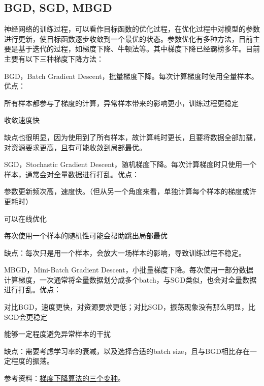 \subsection{BGD, SGD, MBGD}
神经网络的训练过程，可以看作目标函数的优化过程，在优化过程中对模型的参数进行更新，使目标函数逐步收敛到一个最优的状态。参数优化有多种方法，目前主要是基于迭代的过程，如梯度下降、牛顿法等。其中梯度下降已经霸榜多年。目前主要有以下三种梯度下降方法：
\begin{myitemize}
	\item BGD，Batch  Gradient Descent，批量梯度下降。每次计算梯度时使用全量样本。优点：
	\begin{myitemize}
		\item 所有样本都参与了梯度的计算，异常样本带来的影响更小，训练过程更稳定
		\item 收敛速度快
	\end{myitemize}
	缺点也很明显，因为使用到了所有样本，故计算耗时更长，且要将数据全部加载，对资源要求更高，且有可能收敛到局部最优。
	
	\item SGD，Stochastic Gradient Descent，随机梯度下降。每次计算梯度时只使用一个样本，通常会对全量数据进行打乱。优点：
	\begin{myitemize}
		\item 参数更新频次高，速度快。（但从另一个角度来看，单独计算每个样本的梯度或许更耗时）
		\item 可以在线优化
		\item 每次使用一个样本的随机性可能会帮助跳出局部最优
	\end{myitemize}
	缺点：每次只是用一个样本，会放大一场样本的影响，导致训练过程不稳定。
	
	\item MBGD，Mini-Batch Gradient Descent，小批量梯度下降。每次使用一部分数据计算梯度，一次通常将全量数据划分成多个batch，与SGD类似，也会对全量数据进行打乱。优点：
	\begin{myitemize}
		\item 对比BGD，速度更快，对资源要求更低；对比SGD，振荡现象没有那么明显，比SGD会更稳定
		\item 能够一定程度避免异常样本的干扰
	\end{myitemize}
	缺点：需要考虑学习率的衰减，以及选择合适的batch size，且与BGD相比存在一定程度的振荡。
\end{myitemize}
参考资料：\href{https://lumingdong.cn/summary-of-gradient-descent-algorithm.html#%E6%A2%AF%E5%BA%A6%E4%B8%8B%E9%99%8D%E7%AE%97%E6%B3%95%E7%9A%84%E4%B8%89%E4%B8%AA%E5%8F%98%E7%A7%8D}{梯度下降算法的三个变种}。

